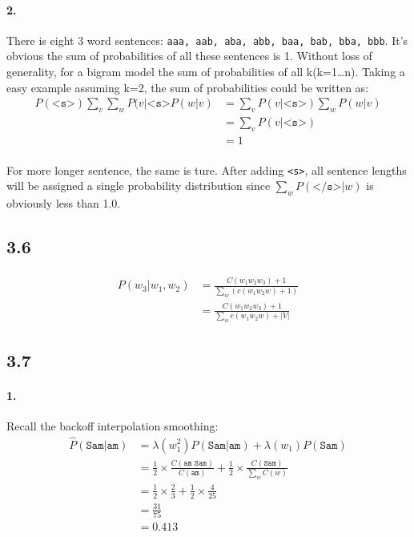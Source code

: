 \documentclass{article}
\begin{document}
\paragraph{2.}
There is eight 3 word sentences: \texttt{aaa, aab, aba, abb, baa, bab, bba, bbb}.
It's obvious the sum of probabilities of all these sentences is 1.
Without loss of generality, for a bigram model the sum of probabilities of all k(k=1\dots n).
Taking a easy example assuming k=2, the sum of probabilities could be written as:
\begin{align*}
    P(\texttt{<s>})\sum_v \sum_w P(v|\texttt{<s>} P(w|v) & = \sum_v P(v|\texttt{<s>}) \sum_w P(w|v) \\
                                                         & = \sum_v P(v|\texttt{<s>})               \\
                                                         & = 1
\end{align*}
\paragraph{}
For more longer sentence, the same is ture. After adding \texttt{<s>}, all sentence lengths will be assigned
a single probability distribution since $\sum_w P(\texttt{</s>}|w)$ is obviously less than 1.0.

\subsection*{3.6}
\paragraph{}
\begin{align*}
    P(w_3|w_1, w_2) & = \frac{C(w_1 w_2 w_3) + 1}{\sum_w (c(w_1 w_2 w) + 1)} \\
                    & =  \frac{C(w_1 w_2 w_3) + 1}{\sum_w c(w_1 w_2 w) + |V|}
\end{align*}

\subsection*{3.7}
\paragraph{1.}
Recall the backoff interpolation smoothing:
\begin{align*}
    \hat{P}(\texttt{Sam|am}) & = \lambda(w_1^2)P(\texttt{Sam|am}) + \lambda(w_1)P(\texttt{Sam})   \\
                             & = \frac{1}{2} \times \frac{C(\texttt{am Sam})}{C(\texttt{am})}
    + \frac{1}{2} \times \frac{C(\texttt{Sam})}{\sum_w C(w)}                                      \\
                             & = \frac{1}{2} \times \frac{2}{3} + \frac{1}{2} \times \frac{4}{25} \\
                             & = \frac{31}{75}                                                    \\
                             & = 0.413
\end{align*}
\end{document}

